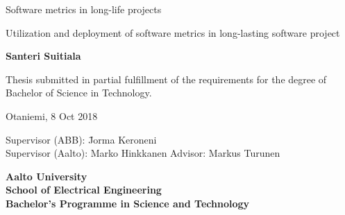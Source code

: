 {\parindent0pt %
\begin{spacing}{1.1}

 {\sffamily{}}
\end{spacing}

\vspace{12.7mm}

\begin{spacing}{1.63}
{\fontsize{17.8pt}{17.8pt}\selectfont Software metrics in long-life projects}
\end{spacing}

\vspace{10.5mm}

\begin{spacing}{1.2}
{\fontsize{13pt}{13pt}\selectfont Utilization and deployment of software metrics in long-lasting software project}
\end{spacing}

\vspace{10.6mm}

{\fontsize{13.9pt}{13.9pt}\bfseries\sffamily\lsstyle Santeri Suitiala}

\vfill

{\fontsize{10.3pt}{10.3pt}\sffamily\lsstyle\raggedright
\begin{spacing}{1.06}

Thesis submitted in partial fulfillment of the requirements for the
degree of Bachelor of Science in Technology.

Otaniemi, 8 Oct 2018

\begin{tabbing}
Supervisor (ABB):\hspace{6mm} \= Jorma Keroneni \\
Supervisor (Aalto): Marko Hinkkanen
Advisor: \> Markus Turunen
\end{tabbing}
\vspace{-4mm}
\end{spacing}
} %

\vspace{11.5mm}

\begin{spacing}{.9}
{\bfseries\sffamily\lsstyle Aalto University \\
School of Electrical Engineering \\
Bachelor’s Programme in Science and Technology}
\end{spacing}
} %



